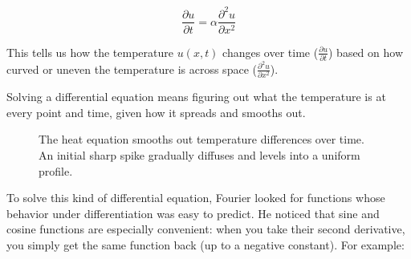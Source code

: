 \[
\frac{\partial u}{\partial t} = \alpha \frac{\partial^2 u}{\partial x^2}
\]


This tells us how the temperature \( u(x, t) \) changes over time (\( \frac{\partial u}{\partial t} \)) based on how curved or uneven the temperature is across space (\( \frac{\partial^2 u}{\partial x^2} \)). 

Solving a differential equation means figuring out what the temperature is at every point and time, given how it spreads and smooths out.

\begin{figure}[H]
\centering
{}
\caption{The heat equation smooths out temperature differences over time. An initial sharp spike gradually diffuses and levels into a uniform profile.}
\end{figure}




To solve this kind of differential equation, Fourier looked for functions whose behavior under differentiation was easy to predict. He noticed that sine and cosine functions are especially convenient: when you take their second derivative, you simply get the same function back (up to a negative constant). For example:

